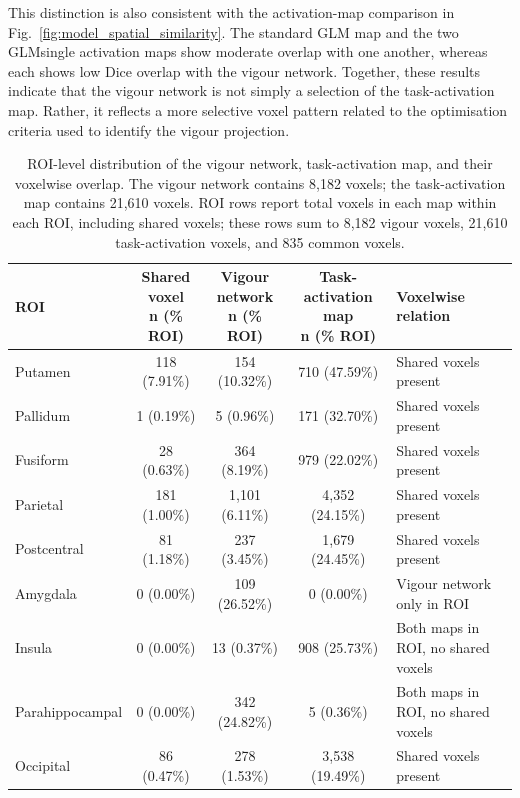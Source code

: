 \documentclass[utf8]{frontiers_suppmat}
\begin{document}
This distinction is also consistent with the activation-map comparison in Fig.~\ref{fig:model_spatial_similarity}. The standard GLM map and the two GLMsingle activation maps show moderate overlap with one another, whereas each shows low Dice overlap with the vigour network. Together, these results indicate that the vigour network is not simply a selection of the task-activation map. Rather, it reflects a more selective voxel pattern related to the optimisation criteria used to identify the vigour projection.

\begin{table}
    \centering
    \caption{ROI-level distribution of the vigour network, task-activation map, and their voxelwise overlap. The vigour network contains 8,182 voxels; the task-activation map contains 21,610 voxels. ROI rows report total voxels in each map within each ROI, including shared voxels; these rows sum to 8,182 vigour voxels, 21,610 task-activation voxels, and 835 common voxels.}
    \label{tab:ablation_full_vs_task_only_roi}
    \begin{tabularx}{\textwidth}{@{}lccc>{\raggedright\arraybackslash}X@{}}
    \toprule
    ROI &
    \makecell{Shared voxel\\n (\% ROI)} &
    \makecell{Vigour network\\n (\% ROI)} &
    \makecell{Task-activation map\\n (\% ROI)} &
    Voxelwise relation \\
    \midrule
    Putamen & 118 (7.91\%) & 154 (10.32\%) & 710 (47.59\%) & Shared voxels present \\
    Pallidum & 1 (0.19\%) & 5 (0.96\%) & 171 (32.70\%) & Shared voxels present \\
    Fusiform & 28 (0.63\%) & 364 (8.19\%) & 979 (22.02\%) & Shared voxels present \\
    Parietal & 181 (1.00\%) & 1,101 (6.11\%) & 4,352 (24.15\%) & Shared voxels present \\
    Postcentral & 81 (1.18\%) & 237 (3.45\%) & 1,679 (24.45\%) & Shared voxels present \\
    Amygdala & 0 (0.00\%) & 109 (26.52\%) & 0 (0.00\%) & Vigour network only in ROI \\
    Insula & 0 (0.00\%) & 13 (0.37\%) & 908 (25.73\%) & Both maps in ROI, no shared voxels \\
    Parahippocampal & 0 (0.00\%) & 342 (24.82\%) & 5 (0.36\%) & Both maps in ROI, no shared voxels \\
    Occipital & 86 (0.47\%) & 278 (1.53\%) & 3,538 (19.49\%) & Shared voxels present \\

\end{tabularx}
\end{table}
\end{document}
